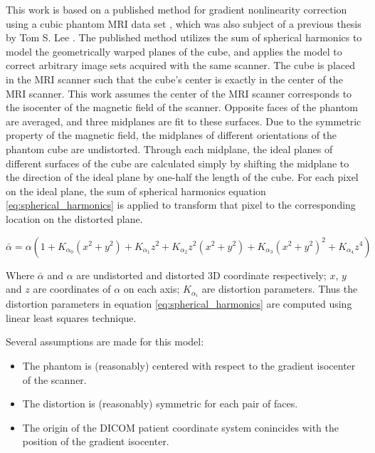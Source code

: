 This work is based on a published method for gradient nonlinearity correction using a cubic phantom MRI data set \cite{Lang99}, which was also subject of a previous thesis by Tom S. Lee \cite{tom}.
The published method utilizes the sum of spherical
harmonics to model the geometrically warped planes of the cube, and applies the model
to correct arbitrary image sets acquired with the same scanner. The cube is
placed in the MRI scanner such that the cube's center is exactly in the center of the MRI scanner.  This work assumes the center of the MRI scanner corresponds to the isocenter of the
magnetic field of the scanner. Opposite faces of the phantom are averaged, and three midplanes are fit to these surfaces.  Due to the symmetric property of the magnetic field,
the midplanes of different orientations of the phantom cube are undistorted.  Through each midplane, the ideal planes of different surfaces
of the cube are calculated simply by shifting the midplane to the direction
of the ideal plane by one-half the length of the cube. For each pixel on
the ideal plane, the sum of spherical
harmonics equation \ref{eq:spherical_harmonics} is applied to transform that pixel to the corresponding location on the distorted plane.

\begin{equation} \label{eq:spherical_harmonics}
\bar{\alpha} = \alpha(1 + K_{\alpha_0}(x^2 + y^2) + K_{\alpha_1}z^2 +
K_{\alpha_2}z^2(x^2 + y^2) + K_{\alpha_3}(x^2 + y^2)^2 +
K_{\alpha_4}z^4)
\end{equation}

Where $\bar{\alpha}$ and $\alpha$ are undistorted and distorted 3D coordinate respectively; $x$, $y$ and $z$ are coordinates of $\alpha$ on each axis; $K_{\alpha_i}$ are distortion parameters. Thus the distortion parameters in
equation \ref{eq:spherical_harmonics} are computed using linear least squares
technique.

Several assumptions are made for this model:
\begin{itemize}
  \item The phantom is (reasonably) centered with respect to the gradient isocenter of the scanner.
  \item The distortion is (reasonably) symmetric for each pair of faces.
  \item The origin of the DICOM patient coordinate system conincides with the position of the gradient
    isocenter.
\end{itemize}


